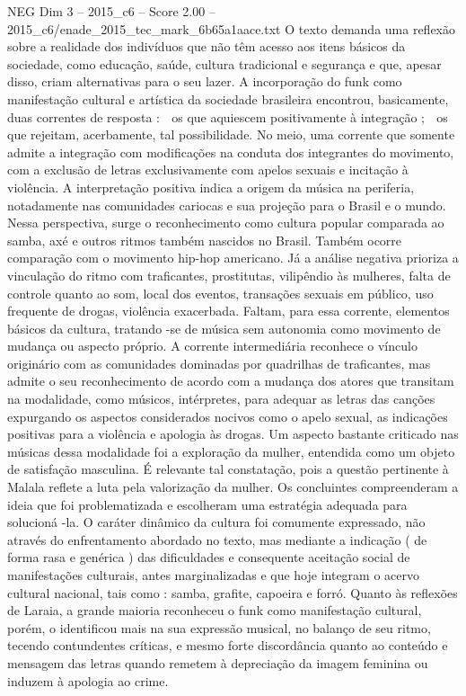 \begin{textsample}{NEG Dim 3 – 2015\_c6 – Score 2.00 – 2015\_c6/enade\_2015\_tec\_mark\_6b65a1aace.txt}
O texto demanda uma reflexão sobre a realidade dos indivíduos que não têm acesso aos itens básicos da sociedade, como educação, saúde, cultura tradicional e segurança e que, apesar disso, criam alternativas para o seu lazer.
A incorporação do funk como manifestação cultural e artística da sociedade brasileira encontrou, basicamente, duas correntes de resposta :  os que aquiescem positivamente à integração ;  os que rejeitam, acerbamente, tal possibilidade.
No meio, uma corrente que somente admite a integração com modificações na conduta dos integrantes do movimento, com a exclusão de letras exclusivamente com apelos sexuais e incitação à violência.
A interpretação positiva indica a origem da música na periferia, notadamente nas comunidades cariocas e sua projeção para o Brasil e o mundo.
Nessa perspectiva, surge o reconhecimento como cultura popular comparada ao samba, axé e outros ritmos também nascidos no Brasil.
Também ocorre comparação com o movimento hip-hop americano.
Já a análise negativa prioriza a vinculação do ritmo com traficantes, prostitutas, vilipêndio às mulheres, falta de controle quanto ao som, local dos eventos, transações sexuais em público, uso frequente de drogas, violência exacerbada.
Faltam, para essa corrente, elementos básicos da cultura, tratando -se de música sem autonomia como movimento de mudança ou aspecto próprio.
A corrente intermediária reconhece o vínculo originário com as comunidades dominadas por quadrilhas de traficantes, mas admite o seu reconhecimento de acordo com a mudança dos atores que transitam na modalidade, como músicos, intérpretes, para adequar as letras das canções expurgando os aspectos considerados nocivos como o apelo sexual, as indicações positivas para a violência e apologia às drogas.
Um aspecto bastante criticado nas músicas dessa modalidade foi a exploração da mulher, entendida como um objeto de satisfação masculina.
É relevante tal constatação, pois a questão pertinente à Malala reflete a luta pela valorização da mulher.
Os concluintes compreenderam a ideia que foi problematizada e escolheram uma estratégia adequada para solucioná -la.
O caráter dinâmico da cultura foi comumente expressado, não através do enfrentamento abordado no texto, mas mediante a indicação ( de forma rasa e genérica ) das dificuldades e consequente aceitação social de manifestações culturais, antes marginalizadas e que hoje integram o acervo cultural nacional, tais como : samba, grafite, capoeira e forró.
Quanto às reflexões de Laraia, a grande maioria reconheceu o funk como manifestação cultural, porém, o identificou mais na sua expressão musical, no balanço de seu ritmo, tecendo contundentes críticas, e mesmo forte discordância quanto ao conteúdo e mensagem das letras quando remetem à depreciação da imagem feminina ou induzem à apologia ao crime.

\end{textsample}
